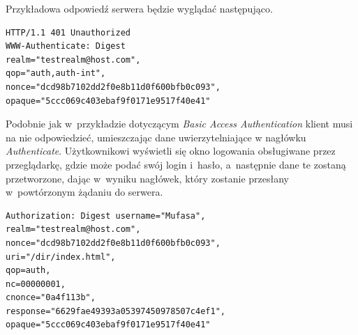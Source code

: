 \documentclass[11pt]{aghdpl}
\begin{document}
Przykładowa odpowiedź serwera będzie wyglądać następująco.
\begin{lstlisting}
HTTP/1.1 401 Unauthorized
WWW-Authenticate: Digest
realm="testrealm@host.com",
qop="auth,auth-int",
nonce="dcd98b7102dd2f0e8b11d0f600bfb0c093",
opaque="5ccc069c403ebaf9f0171e9517f40e41"
\end{lstlisting}

Podobnie jak w~przykładzie dotyczącym \emph{Basic Access Authentication} klient musi na nie odpowiedzieć, umieszczając dane uwierzytelniające w nagłówku \emph{Authenticate}. Użytkownikowi wyświetli się okno logowania obsługiwane przez przeglądarkę, gdzie może podać swój login i~hasło, a~następnie dane te zostaną przetworzone, dając w~wyniku nagłówek, który zostanie przesłany w~powtórzonym żądaniu do serwera.
\begin{lstlisting}
Authorization: Digest username="Mufasa",
realm="testrealm@host.com",
nonce="dcd98b7102dd2f0e8b11d0f600bfb0c093",
uri="/dir/index.html",
qop=auth,
nc=00000001,
cnonce="0a4f113b",
response="6629fae49393a05397450978507c4ef1",
opaque="5ccc069c403ebaf9f0171e9517f40e41"
\end{lstlisting}
\end{document}
